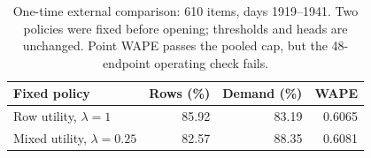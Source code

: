 \begin{table}[H]
\centering\small
\caption{One-time external comparison: 610 items, days 1919--1941. Two policies were fixed before opening; thresholds and heads are unchanged. Point WAPE passes the pooled cap, but the 48-endpoint operating check fails.}
\label{tab:external}
\begin{tabular}{lrrr}
\toprule
Fixed policy & Rows (\%) & Demand (\%) & WAPE\\
\midrule
Row utility, $\lambda=1$ & 85.92 & 83.19 & 0.6065 \\
Mixed utility, $\lambda=0.25$ & 82.57 & 88.35 & 0.6081 \\
\bottomrule
\end{tabular}
\end{table}
